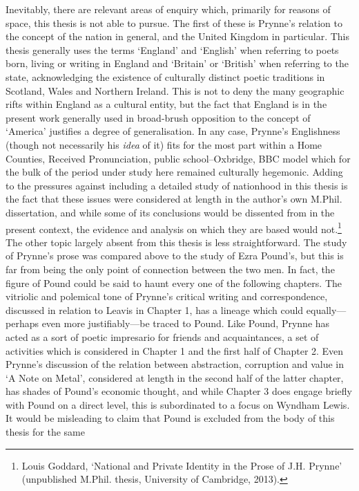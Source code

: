 \documentclass[]{article}
\begin{document}
Inevitably, there are relevant areas of enquiry which, primarily for
reasons of space, this thesis is not able to pursue. The first of these
is Prynne’s relation to the concept of the nation in general, and the
United Kingdom in particular. This thesis generally uses the terms
‘England’ and ‘English’ when referring to poets born, living or writing
in England and ‘Britain’ or ‘British’ when referring to the state,
acknowledging the existence of culturally distinct poetic traditions in
Scotland, Wales and Northern Ireland. This is not to deny the many
geographic rifts within England as a cultural entity, but the fact that
England is in the present work generally used in broad-brush opposition
to the concept of ‘America’ justifies a degree of generalisation. In any
case, Prynne’s Englishness (though not necessarily his \emph{idea} of
it) fits for the most part within a Home Counties, Received
Pronunciation, public school–Oxbridge, BBC model which for the bulk of
the period under study here remained culturally hegemonic. Adding to the
pressures against including a detailed study of nationhood in this
thesis is the fact that these issues were considered at length in the
author’s own M.Phil. dissertation, and while some of its conclusions
would be dissented from in the present context, the evidence and
analysis on which they are based would not.\footnote{Louis Goddard,
  ‘National and Private Identity in the Prose of J.H. Prynne’
  (unpublished M.Phil. thesis, University of Cambridge, 2013).} The
other topic largely absent from this thesis is less straightforward. The
study of Prynne’s prose was compared above to the study of Ezra Pound’s,
but this is far from being the only point of connection between the two
men. In fact, the figure of Pound could be said to haunt every one of
the following chapters. The vitriolic and polemical tone of Prynne’s
critical writing and correspondence, discussed in relation to Leavis in
Chapter 1, has a lineage which could equally—perhaps even more
justifiably—be traced to Pound. Like Pound, Prynne has acted as a sort
of poetic impresario for friends and acquaintances, a set of activities
which is considered in Chapter 1 and the first half of Chapter 2. Even
Prynne’s discussion of the relation between abstraction, corruption and
value in ‘A Note on Metal’, considered at length in the second half of
the latter chapter, has shades of Pound’s economic thought, and while
Chapter 3 does engage briefly with Pound on a direct level, this is
subordinated to a focus on Wyndham Lewis. It would be misleading to
claim that Pound is excluded from the body of this thesis for the same
\end{document}

